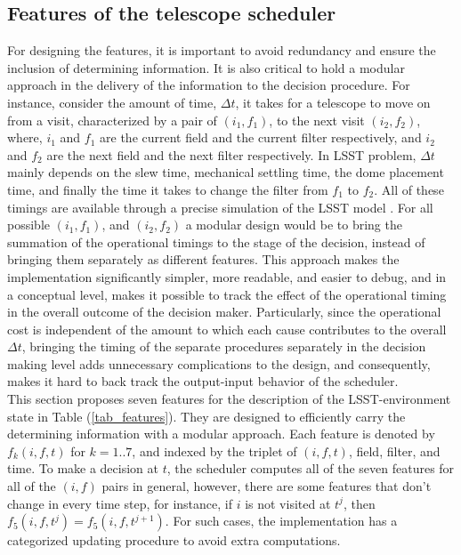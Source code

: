 \documentclass[11pt]{article}
\theoremstyle{definition}
\begin{document}
\subsection{Features of the telescope scheduler}\label{sec_lsst_features}
For designing the features, it is important to avoid redundancy and ensure the inclusion of determining information. It is also critical to hold a modular approach in the delivery of the information to the decision procedure. For instance, consider the amount of time, $\Delta t$, it takes for a telescope to move on from a visit, characterized by a pair of $(i_1,f_1)$, to the next visit $(i_2,f_2)$,  where, $i_1$ and $f_1$ are the current field and the current filter respectively, and $i_2$ and $f_2$ are the next field and the next filter respectively. In LSST problem, $\Delta t$ mainly depends on the slew time, mechanical settling time, the dome placement time, and finally the time it takes to change the filter from $f_1$ to $f_2$. All of these timings are available through a precise simulation of the LSST model \cite{delgado2014lsst}. For all possible $(i_1,f_1)$, and $(i_2,f_2)$ a modular design would be to bring the summation of the operational timings to the stage of the decision, instead of bringing them separately as different features. This approach makes the implementation significantly simpler, more readable, and easier to debug, and in a conceptual level, makes it possible to track the effect of the operational timing in the overall outcome of the decision maker. Particularly, since the operational cost is independent of the amount to which each cause contributes to the overall $\Delta t$, bringing the timing of the separate procedures separately in the decision making level adds unnecessary complications to the design, and consequently, makes it hard to back track the output-input behavior of the scheduler. \\
This section proposes seven features for the description of the LSST-environment state in Table (\ref{tab_features}). They are designed to efficiently carry the determining information with a modular approach. Each feature is denoted by $f_k(i,f,t)$ for $k= 1..7$, and indexed by the triplet of $(i,f,t)$, field, filter, and time. To make a decision at $t$, the scheduler computes all of the seven features for all of the $(i,f)$ pairs in general, however, there are some features that don't change in every time step, for instance, if $i$ is not visited at $t^j$, then $f_5(i,f,t^j)= f_5(i,f,t^{j+1})$. For such cases, the implementation has a categorized updating procedure to avoid extra computations.
\end{document}
